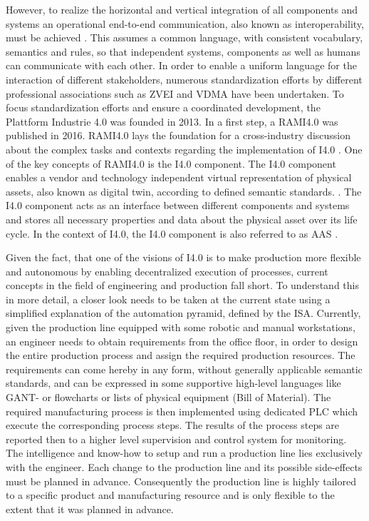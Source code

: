 However, to realize the horizontal and vertical integration of all components and systems an operational end-to-end communication, also known as interoperability, must be achieved \cite[p.858]{Uslander2015ReferenceApproach} \cite[p.39]{Acatech2013Recommendations4.0}. This assumes a common language, with consistent vocabulary, semantics and rules, so that independent systems, components as well as humans can communicate with each other. In order to enable a uniform language for the interaction of different stakeholders, numerous standardization efforts by different professional associations such as \ac{ZVEI} and \ac{VDMA} have been undertaken. To focus standardization efforts and ensure a coordinated development, the Plattform Industrie 4.0 was founded in 2013. In a first step, a \ac{RAMI4.0} was published in 2016. \ac{RAMI4.0} lays the foundation for a cross-industry discussion about the complex tasks and contexts regarding the implementation of \ac{I4.0} \cite[p. 858]{Uslander2015ReferenceApproach} \cite[p.4]{Heidel2017ReferenzarchitekturmodellIndustrie4.0Komponente}. One of the key concepts of \ac{RAMI4.0} is the \ac{I4.0} component. The \ac{I4.0} component enables a vendor and technology independent virtual representation of physical assets, also known as digital twin, according to defined semantic standards. \cite[p.67]{Heidel2017ReferenzarchitekturmodellIndustrie4.0Komponente}. The \ac{I4.0} component acts as an interface between different components and systems and stores all necessary properties and data about the physical asset over its life cycle. In the context of \ac{I4.0}, the \ac{I4.0} component is also referred to as \ac{AAS} \cite[p.68]{Heidel2017ReferenzarchitekturmodellIndustrie4.0Komponente}.

Given the fact, that one of the visions of \ac{I4.0} is to make production more flexible and autonomous by enabling decentralized execution of processes, current concepts in the field of engineering and production fall short. To understand this in more detail, a closer look needs to be taken at the current state using a simplified explanation of the automation pyramid, defined by the \ac{ISA}. Currently, given the production line equipped with some robotic and manual workstations, an engineer needs to obtain requirements from the office floor, in order to design the entire production process and assign the required production resources. The requirements can come hereby in any form, without generally applicable semantic standards, and can be expressed in some supportive high-level languages like GANT- or flowcharts or lists of physical equipment (Bill of Material). The required manufacturing process is then implemented using dedicated \ac{PLC} which execute the corresponding process steps. The results of the process steps are reported then to a higher level supervision and control system for monitoring. The intelligence and know-how to setup and run a production line lies exclusively with the engineer. Each change to the production line and its possible side-effects must be planned in advance. Consequently the production line is highly tailored to a specific product and manufacturing resource and is only flexible to the extent that it was planned in advance. \cite[p.1]{Keddis2015Capability-basedSystems}

